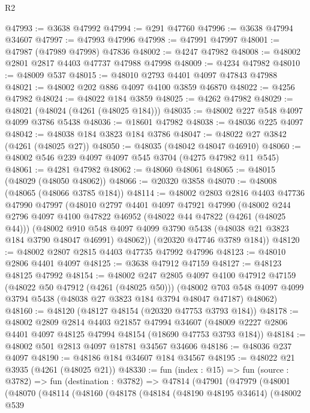 \begin{lexlean}{R2}
\begin{coremodule}
@47993 := @3638 @47992
@47994 := @291 @47760
@47996 := @3638 @47994 @34607
@47997 := @47993 @47996
@47998 := @47991 @47997
@48001 := @47987 (@47989 @47998) @47836
@48002 := @4247 @47982
@48008 := @48002 @2801 @2817 @4403 @47737 @47988 @47998
@48009 := @4234 @47982
@48010 := @48009 @537
@48015 := @48010 @2793 @4401 @4097 @47843 @47988
@48021 := @48002 @202 @886 @4097 @4100 @3859 @46870
@48022 := @4256 @47982
@48024 := @48022 @184 @3859
@48025 := @4262 @47982
@48029 := @48021 (@48024 (@4261 (@48025 @184)))
@48035 := @48002 @227 @548 @4097 @4099 @3786 @5438
@48036 := @18601 @47982
@48038 := @48036 @225 @4097
@48042 := @48038 @184 @3823 @184 @3786
@48047 := @48022 @27 @3842 (@4261 (@48025 @27))
@48050 := @48035 (@48042 @48047 @46910)
@48060 := @48002 @546 @239 @4097 @4097 @545 @3704 (@4275 @47982 @11 @545)
@48061 := @4281 @47982
@48062 := @48060 @48061
@48065 := @48015 (@48029 (@48050 @48062))
@48066 := @20320 @3858
@48070 := @48008 (@48065 (@48066 @3785 @184))
@48114 := @48002
    @2803
    @2816
    @4403
    @47736
    @47990
    @47997
    (@48010
      @2797
      @4401
      @4097
      @47921
      @47990
      (@48002
        @244
        @2796
        @4097
        @4100
        @47822
        @46952
        (@48022 @44 @47822 (@4261 (@48025 @44)))
        (@48002
          @910
          @548
          @4097
          @4099
          @3790
          @5438
          (@48038 @21 @3823 @184 @3790 @48047 @46991)
          @48062))
      (@20320 @47746 @3789 @184))
@48120 := @48002 @2807 @2815 @4403 @47735 @47992 @47996
@48123 := @48010 @2806 @4401 @4097
@48125 := @3638 @47912 @47159
@48127 := @48123 @48125 @47992
@48154 := @48002
    @247
    @2805
    @4097
    @4100
    @47912
    @47159
    (@48022 @50 @47912 (@4261 (@48025 @50)))
    (@48002 @703 @548 @4097 @4099 @3794 @5438 (@48038 @27 @3823 @184 @3794 @48047 @47187) @48062)
@48160 := @48120 (@48127 @48154 (@20320 @47753 @3793 @184))
@48178 := @48002
    @2809
    @2814
    @4403
    @21857
    @47994
    @34607
    (@48009 @2227 @2806 @4401 @4097 @48125 @47994 @48154 (@18690 @47753 @3793 @184))
@48184 := @48002 @501 @2813 @4097 @18781 @34567 @34606
@48186 := @48036 @237 @4097
@48190 := @48186 @184 @34607 @184 @34567
@48195 := @48022 @21 @3935 (@4261 (@48025 @21))
@48330 := fun (index : @15) =>
  fun (source : @3782) =>
  fun (destination : @3782) =>
  @47814
    (@47901
      (@47979
        (@48001
          (@48070
            (@48114
              (@48160
                (@48178
                  (@48184
                    (@48190 @48195 @34614)
                    (@48002
                      @539

\end{coremodule}
\end{lexlean}
